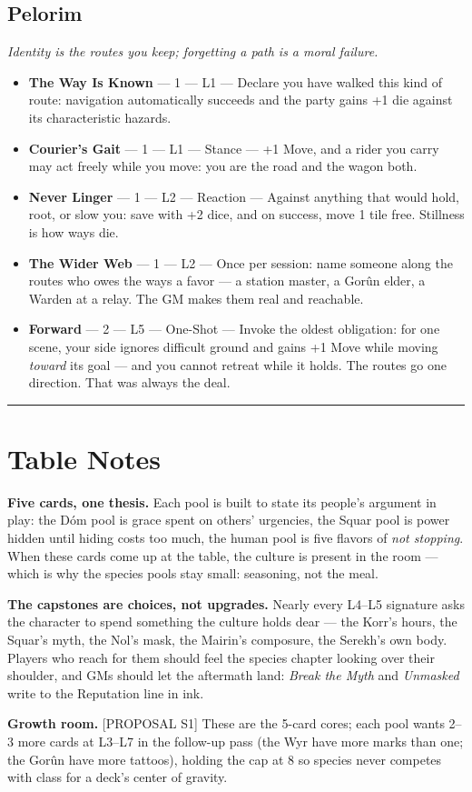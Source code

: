 \subsection{Pelorim}
\textit{Identity is the routes you keep; forgetting a path is a moral failure.}
\begin{itemize}
    \item \textbf{The Way Is Known} --- 1 --- L1 --- Declare you have walked this kind of route: navigation automatically succeeds and the party gains +1 die against its characteristic hazards.
    \item \textbf{Courier's Gait} --- 1 --- L1 --- Stance --- +1 Move, and a rider you carry may act freely while you move: you are the road and the wagon both.
    \item \textbf{Never Linger} --- 1 --- L2 --- Reaction --- Against anything that would hold, root, or slow you: save with +2 dice, and on success, move 1 tile free. Stillness is how ways die.
    \item \textbf{The Wider Web} --- 1 --- L2 --- Once per session: name someone along the routes who owes the ways a favor --- a station master, a Gorûn elder, a Warden at a relay. The GM makes them real and reachable.
    \item \textbf{Forward} --- 2 --- L5 --- One-Shot --- Invoke the oldest obligation: for one scene, your side ignores difficult ground and gains +1 Move while moving \textit{toward} its goal --- and you cannot retreat while it holds. The routes go one direction. That was always the deal.
\end{itemize}

\medskip\hrule\medskip

\section{Table Notes}

\textbf{Five cards, one thesis.} Each pool is built to state its people's argument in play: the Dóm pool is grace spent on others' urgencies, the Squar pool is power hidden until hiding costs too much, the human pool is five flavors of \textit{not stopping}. When these cards come up at the table, the culture is present in the room --- which is why the species pools stay small: seasoning, not the meal.

\textbf{The capstones are choices, not upgrades.} Nearly every L4--L5 signature asks the character to spend something the culture holds dear --- the Korr's hours, the Squar's myth, the Nol's mask, the Mairin's composure, the Serekh's own body. Players who reach for them should feel the species chapter looking over their shoulder, and GMs should let the aftermath land: \textit{Break the Myth} and \textit{Unmasked} write to the Reputation line in ink.

\textbf{Growth room.} [PROPOSAL S1] These are the 5-card cores; each pool wants 2--3 more cards at L3--L7 in the follow-up pass (the Wyr have more marks than one; the Gorûn have more tattoos), holding the cap at 8 so species never competes with class for a deck's center of gravity.
